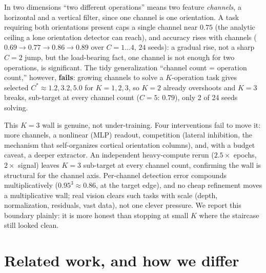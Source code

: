 \documentclass[11pt]{article}
\begin{document}
In two dimensions ``two different operations'' means two feature \emph{channels}, a horizontal and a
vertical filter, since one channel is one orientation. A task requiring both orientations present
caps a single channel near $0.75$ (the analytic ceiling a lone orientation detector can reach), and
accuracy rises with channels ($0.69 \to 0.77 \to 0.86 \to 0.89$ over $C{=}1{\ldots}4$, $24$ seeds): a
gradual rise, not a sharp $C{=}2$ jump, but the load-bearing fact, one channel is not enough for two
operations, is significant. The tidy generalization ``channel count = operation count,'' however,
\textbf{fails}: growing channels to solve a $K$-operation task gives selected $C^\ast \approx 1.2, 3.2,
5.0$ for $K{=}1,2,3$, so $K{=}2$ already overshoots and $K{=}3$ breaks, sub-target at every channel
count ($C{=}5$: $0.79$), only 2 of 24 seeds solving.

This $K{=}3$ wall is genuine, not under-training. Four interventions fail to move it: more channels, a
nonlinear (MLP) readout, competition (lateral inhibition, the mechanism that self-organizes cortical
orientation columns), and, with a budget caveat, a deeper extractor. An independent heavy-compute
rerun ($2.5\times$ epochs, $2\times$ signal) leaves $K{=}3$ sub-target at every channel count, confirming
the wall is structural for the channel axis. Per-channel detection error compounds multiplicatively
($0.95^3 \approx 0.86$, at the target edge), and no cheap refinement moves a multiplicative wall; real
vision clears such tasks with scale (depth, normalization, residuals, vast data), not one clever
pressure. We report this boundary plainly: it is more honest than stopping at small $K$ where the
staircase still looked clean.

\section{Related work, and how we differ}
\end{document}

